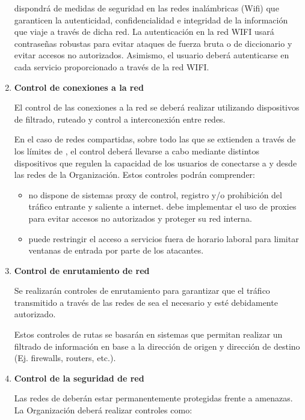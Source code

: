 \begin{enumerate}[label=\alph*)]
    \Beneficiario{} dispondrá de medidas de seguridad en las redes inalámbricas (Wifi) que garanticen la autenticidad, confidencialidad e integridad de la información que viaje a través de dicha red. La autenticación en la red WIFI usará contraseñas robustas para evitar ataques de fuerza bruta o de diccionario y evitar accesos no autorizados. Asimismo, el usuario deberá autenticarse en cada servicio proporcionado a través de la red WIFI.

    \item \textbf{Control de conexiones a la red}

    El control de las conexiones a la red se deberá realizar utilizando dispositivos de filtrado, ruteado y control a interconexión entre redes.

    En el caso de redes compartidas, sobre todo las que se extienden a través de los límites de \Beneficiario{}, el control deberá llevarse a cabo mediante distintos dispositivos que regulen la capacidad de los usuarios de conectarse a y desde las redes de la Organización. Estos controles podrán comprender:

    \begin{itemize}
        \item \Beneficiario{} no dispone de sistemas proxy de control, registro y/o prohibición del tráfico entrante y saliente a internet. \Beneficiario{} debe implementar el uso de proxies para evitar accesos no autorizados y proteger su red interna.
        \item \Beneficiario{} puede restringir el acceso a servicios fuera de horario laboral para limitar ventanas de entrada por parte de los atacantes.
    \end{itemize}

    \item \textbf{Control de enrutamiento de red}

    Se realizarán controles de enrutamiento para garantizar que el tráfico transmitido a través de las redes de \Beneficiario{} sea el necesario y esté debidamente autorizado.

    Estos controles de rutas se basarán en sistemas que permitan realizar un filtrado de información en base a la dirección de origen y dirección de destino (Ej. firewalls, routers, etc.).

    \item \textbf{Control de la seguridad de red}

    Las redes de \Beneficiario{} deberán estar permanentemente protegidas frente a amenazas. La Organización deberá realizar controles como:


\end{enumerate}
